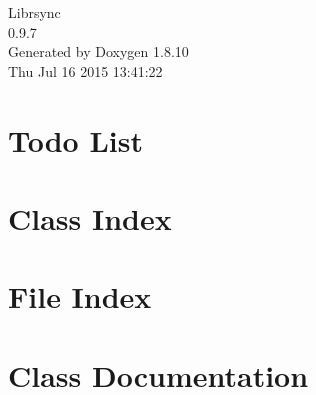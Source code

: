\documentclass[twoside]{book}
\newcommand{\+}{\discretionary{\mbox{\scriptsize$\hookleftarrow$}}{}{}}
\newcommand{\clearemptydoublepage}{%
  \newpage{\pagestyle{empty}\cleardoublepage}%
}
\begin{document}
\hypersetup{pageanchor=false,
             bookmarks=true,
             bookmarksnumbered=true,
             pdfencoding=unicode
            }
\begin{titlepage}
\vspace*{7cm}
\begin{center}%
{\Large Librsync \\[1ex]\large 0.\+9.\+7 }\\
\vspace*{1cm}
{\large Generated by Doxygen 1.8.10}\\
\vspace*{0.5cm}
{\small Thu Jul 16 2015 13:41:22}\\
\end{center}
\end{titlepage}
\clearemptydoublepage
\tableofcontents
\clearemptydoublepage
{}
\hypersetup{pageanchor=true}

\chapter{Todo List}
\label{todo}
\hypertarget{todo}{}

\chapter{Class Index}

\chapter{File Index}

\chapter{Class Documentation}

















\end{document}
